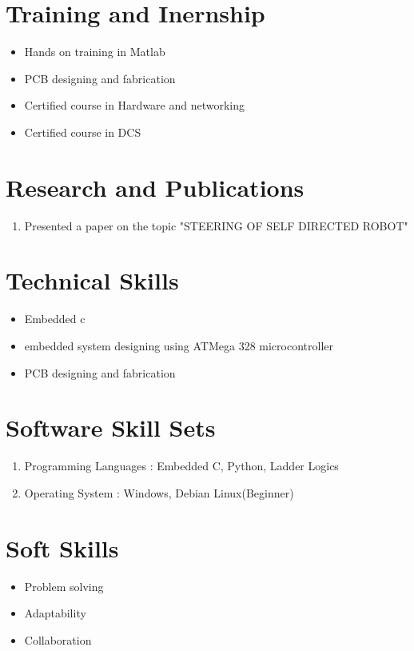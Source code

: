 \documentclass{My_CV_Class}
\begin{document}
\section{Training and Inernship}
\begin{itemize}
	\item Hands on training in Matlab
	\item PCB designing and fabrication
	\item Certified course in Hardware and networking
	\item Certified course in DCS
\end{itemize}
\section{Research and Publications}
\begin{enumerate}
	\item Presented a paper on the topic "STEERING OF SELF DIRECTED ROBOT"
\end{enumerate}
\section{Technical Skills}
\begin{itemize}
	\item Embedded c 
	\item embedded system designing using ATMega 328 microcontroller
	\item PCB designing and fabrication 
\end{itemize}
\newpage
\section{Software Skill Sets}
\begin{enumerate}
	\item Programming Languages : Embedded C, Python, Ladder Logics
	\item Operating System      : Windows, Debian Linux(Beginner)
\end{enumerate}
\section{Soft Skills}
\begin{itemize}
	\item Problem solving
	\item Adaptability
	\item Collaboration
\end{itemize}
\end{document}
